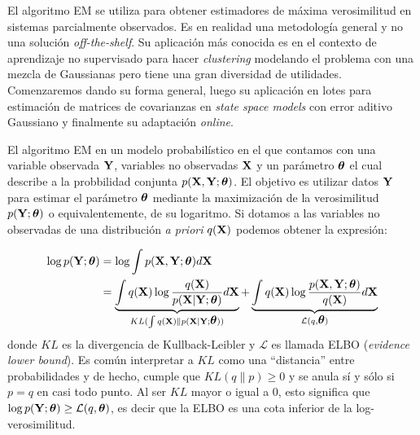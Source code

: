 El algoritmo EM se utiliza para obtener estimadores de máxima verosimilitud en sistemas parcialmente observados. Es en realidad una metodología general y no una solución \textit{off-the-shelf}. Su aplicación más conocida es en el contexto de aprendizaje no supervisado para hacer \textit{clustering} modelando el problema con una mezcla de Gaussianas \citep{Bishop2006} pero tiene una gran diversidad de utilidades. Comenzaremos dando su forma general, luego su aplicación en lotes para estimación de matrices de covarianzas en \textit{state space models} con error aditivo Gaussiano y finalmente su adaptación \textit{online}.

El algoritmo EM en un modelo probabilístico en el que contamos con una variable observada $\mathbf{Y}$, variables no observadas $\mathbf{X}$ y un parámetro $\mbox{\boldmath$ \theta $}$ el cual describe a la probbilidad conjunta $p(\mathbf{X},  \mathbf{Y}; \mbox{\boldmath$ \theta $})$. El objetivo es utilizar datos $\mathbf{Y}$ para estimar el parámetro $\mbox{\boldmath$ \theta $}$ mediante la maximización de la verosimilitud $p(\mathbf{Y}; \mbox{\boldmath$ \theta $})$ o equivalentemente, de su logaritmo. Si dotamos a las variables no observadas de una distribución \textit{a priori} $q(\mathbf{X})$ podemos obtener la expresión:

\begin{align}
    \log p(\mathbf{Y}; \mbox{\boldmath$ \theta $}) &=  \log \int p(\mathbf{X}, \mathbf{Y}; \mbox{\boldmath$ \theta $}) d\mathbf{X} \\
    &=  \underbrace{\int q(\mathbf{X}) \log \frac{q(\mathbf{X})}{p(\mathbf{X} | \mathbf{Y}; \mbox{\boldmath$ \theta $})} d\mathbf{X}}_{KL(\int q(\mathbf{X}) \rVert p(\mathbf{X} | \mathbf{Y}; \mbox{\boldmath$ \theta $}))} + \underbrace{\int q(\mathbf{X}) \log \frac{p(\mathbf{X}, \mathbf{Y}; \mbox{\boldmath$ \theta $})}{q(\mathbf{X})} d\mathbf{X}}_{\mathcal{L}(q, \mbox{\boldmath$ \theta $})} \label{eq:elbo_KL}
\end{align}
donde $KL$ es la divergencia de Kullback-Leibler y $\mathcal{L}$ es llamada ELBO (\textit{evidence lower bound}). Es común interpretar a $KL$ como una ``distancia'' entre probabilidades y de hecho, cumple que $KL(q \rVert p) \geq 0$ y se anula sí y sólo si $p = q$ en casi todo punto. Al ser $KL$ mayor o igual a 0, esto significa que $\log p(\mathbf{Y}; \mbox{\boldmath$ \theta $}) \geq \mathcal{L}(q, \mbox{\boldmath$ \theta $})$, es decir que la ELBO es una cota inferior de la log-verosimilitud.  

